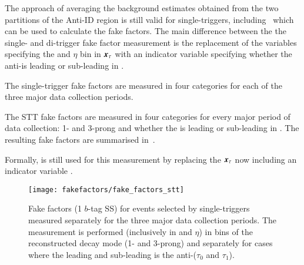 The approach of averaging the background estimates obtained from the
two partitions of the Anti-ID region is still valid for
single-\tauhadvis triggers, including~
which can be used to calculate the fake factors. The main difference
between the the single- and di-\tauhadvis trigger fake factor
measurement is the replacement of the variables specifying the \pT and
$\eta$ bin in $\myvec{x}_\tau$ with an indicator variable specifying
whether the anti-\tauhadvis is leading or sub-leading in \pT.


The single-\tauhadvis trigger fake factors are measured in four
categories for each of the three major data collection periods.

The STT fake factors are measured in four categories for every major
period of data collection: 1- and 3-prong \tauhadvis and whether the
\tauhadvis is leading or sub-leading in \pT. The resulting fake
factors are summarised in~.

Formally,  is still used for this
measurement by replacing the
$\myvec{x}_\tau$ now including an
indicator variable .




\begin{figure}[htbp]
  \centering

  \texttt{[image: fakefactors/fake\_factors\_stt]}

  \caption{Fake factors (1 $b$-tag SS) for events selected by
    single-\tauhadvis triggers measured separately for the three major
    data collection periods. The measurement is performed (inclusively
    in \tauhadvis \pT and $\eta$) in bins of the reconstructed
    \tauhadvis decay mode (1- and 3-prong) and separately for cases
    where the \pT leading and sub-leading \tauhadvis is the
    anti-\tauhadvis ($\tau_0$ and $\tau_1$).}%
  \label{fig:mjfakes_stt_ffs}

\end{figure}


